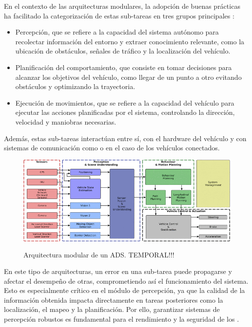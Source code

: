 En el contexto de las arquitecturas modulares, la adopción de buenas prácticas ha facilitado la categorización de estas \mbox{sub-tareas} en tres grupos principales \cite{machines5010006}\cite{functional_architectures}: 
\begin{itemize}
    \item Percepción, que se refiere a la capacidad del sistema autónomo para recolectar información del entorno y extraer conocimiento relevante, como la ubicación de obstáculos, señales de tráfico y la localización del vehículo.
    \item Planificación del comportamiento, que consiste en tomar decisiones para alcanzar los objetivos del vehículo, como llegar de un punto a otro evitando obstáculos y optimizando la trayectoria.
    \item Ejecución de movimientos, que se refiere a la capacidad del vehículo para ejecutar las acciones planificadas por el sistema, controlando la dirección, velocidad y maniobras necesarias.
\end{itemize}
Además, estas \mbox{sub-tareas} interactúan entre sí, con el hardware del vehículo y con sistemas de comunicación como  o  en el caso de los vehículos conectados.

\begin{figure}[H]
    \centering
    \includegraphics[width=\linewidth]{images/sota/ADS_information_flow.png}
    \label{sota_ads_information_flow}
    \caption{Arquitectura modular de un ADS. TEMPORAL!!!}
\end{figure}

En este tipo de arquitecturas, un error en una \mbox{sub-tarea} puede propagarse y afectar el desempeño de otras, comprometiendo así el funcionamiento del sistema. Esto es especialmente crítico en el módulo de percepción, ya que la calidad de la información obtenida impacta directamente en tareas posteriores como la localización, el mapeo y la planificación. Por ello, garantizar sistemas de percepción robustos es fundamental para el rendimiento y la seguridad de los .

